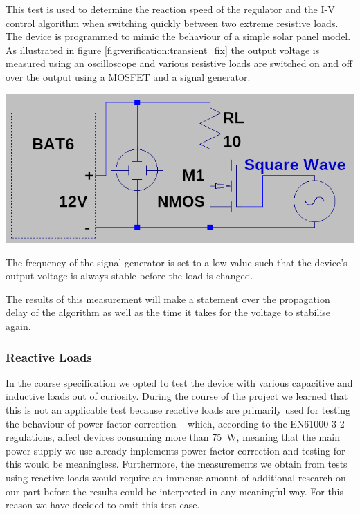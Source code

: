 \begin{minipage}{0.5\textwidth}
    This  test is  used  to  determine the  reaction  speed  of the  regulator
    and  the  I-V  control  algorithm   when  switching  quickly  between  two
    extreme  resistive  loads.    The  device  is  programmed   to  mimic  the
    behaviour  of  a simple  solar  panel  model.   As illustrated  in  figure
    \ref{fig:verification:transient_fix} the output  voltage is measured using
    an oscilloscope and  various resistive loads are switched on  and off over
    the output using a MOSFET and a signal generator.
\end{minipage}
\begin{minipage}{0.5\textwidth}
    \centering
    \includegraphics[width=.9\textwidth]{images/sim/transient-fixture.png}
    \label{fig:verification:transient_fix}
\end{minipage}

The frequency of the signal generator is set  to  a  low  value  such  that  the
device's output voltage is always stable before the load is changed.

The results of this measurement will make a statement over the propagation delay
of  the  algorithm as well as the time it takes for  the  voltage  to  stabilise
again.


\subsubsection{Reactive Loads}

In the coarse specification we  opted to test the device with various capacitive
and  inductive  loads  out  of  curiosity. During the course of the  project  we
learned that this is not an applicable test because reactive loads are primarily
used for testing the behaviour of power factor correction -- which, according to
the EN61000-3-2  regulations\cite{ref:pfc},  affect  devices consuming more than
\SI{75}{\watt},  meaning  that  the main power supply we use already implements
power factor correction and testing for this would  be meaningless. Furthermore,
the measurements we obtain  from  tests  using  reactive  loads would require an
immense  amount of additional research on our part before the results  could  be
interpreted in any  meaningful way. For this reason we have decided to omit this
test case.


